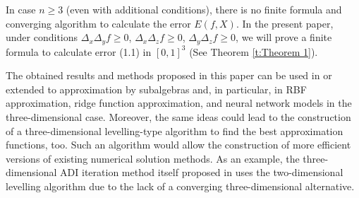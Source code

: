 \documentclass[12p]{article}
\numberwithin{equation}{section}
\begin{document}
In case $n \ge 3$ (even with additional conditions), there is no finite formula and converging algorithm to calculate the error $E(f, X)$.
In the present paper, under conditions $\Delta_x\Delta_y f\ge 0$, $\Delta_x\Delta_z f\ge 0$, $\Delta_y\Delta_z f\ge 0$, we will prove a finite formula to calculate error (1.1) in  $[0,1]^3$ (See Theorem \ref{t:Theorem 1}). 

The obtained results and methods proposed in this paper can be used in or extended to approximation by subalgebras and, in particular, in RBF approximation, ridge function approximation, and neural network models in the three-dimensional case. Moreover, the same ideas could lead to the construction of a three-dimensional levelling-type algorithm to find the best approximation functions, too. Such an algorithm would allow the construction of more efficient versions of existing numerical solution methods. As an example, the three-dimensional ADI iteration method itself proposed in \cite{Wachspress_1994} uses the two-dimensional levelling algorithm due to the lack of a converging three-dimensional alternative.
\end{document}
